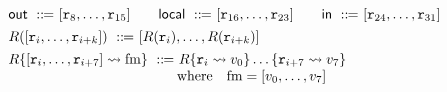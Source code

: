 \begin{figure}[!t]
    \[
     \begin{array}{l}
     \outRN \ \define \  [\reg{8}, \dots, \reg{15}]
     \qquad
     \localRN \ \define \  [\reg{16}, \dots, \reg{23}] %
      \qquad
     \inRN \ \define \  [\reg{24}, \dots, \reg{31}]
     \\
     \\[-8pt]
     \RFile([\reg{i}, \dots, \reg{i+k}]) \ \define\
     [\RFile(\reg{i}), \dots, \RFile(\reg{i+k})]
     \\
     \\[-8pt]
     \Rupd{\reg{i}, \dots, \reg{i+7}}{\fm} \ \define \
			R\{ \reg{i} \rightsquigarrow \val_0 \} 
				\dots \{ \reg{i+7} \rightsquigarrow \val_7 \} \\
            \hspace*{28ex}\text{where }\ \ \fm = [\val_0, \dots, \val_7]
     \\
     \\ %


\end{array}\]
\end{figure}
